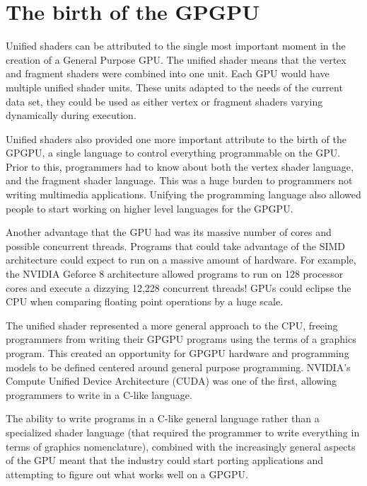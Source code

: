 \section*{The birth of the GPGPU}

Unified shaders can be attributed to the single most important moment in the creation of a General Purpose GPU. The unified shader means that the vertex and fragment shaders were combined into one unit. Each GPU would have multiple unified shader units. These units adapted to the needs of the current data set, they could be used as either vertex or fragment shaders varying dynamically during execution. 

Unified shaders also provided one more important attribute to the birth of the GPGPU, a single language to control everything programmable on the GPU. Prior to this, programmers had to know about both the vertex shader language, and the fragment shader language. This was a huge burden to programmers not writing multimedia applications. Unifying the programming language also allowed people to start working on higher level languages for the GPGPU. \cite{gpucomputing}

Another advantage that the GPU had was its massive number of cores and possible concurrent threads.  Programs that could take advantage of the SIMD architecture could expect to run on a massive amount of hardware. For example, the NVIDIA Geforce 8 architecture allowed programs to run on 128 processor cores and execute a dizzying 12,228 concurrent threads! GPUs could eclipse the CPU when comparing floating point operations by a huge scale. \cite{emergingtech}

The unified shader represented a more general approach to the CPU, freeing programmers from writing their GPGPU programs using the terms of a graphics program. This created an opportunity for GPGPU hardware and programming models to be defined centered around general purpose programming. NVIDIA's Compute Unified Device Architecture (CUDA) was one of the first, allowing programmers to write in a C-like language. 

The ability to write programs in a C-like general language rather than a specialized shader language (that required the programmer to write everything in terms of graphics nomenclature), combined with the increasingly general aspects of the GPU meant that the industry could start porting applications and attempting to figure out what works well on a GPGPU. 

